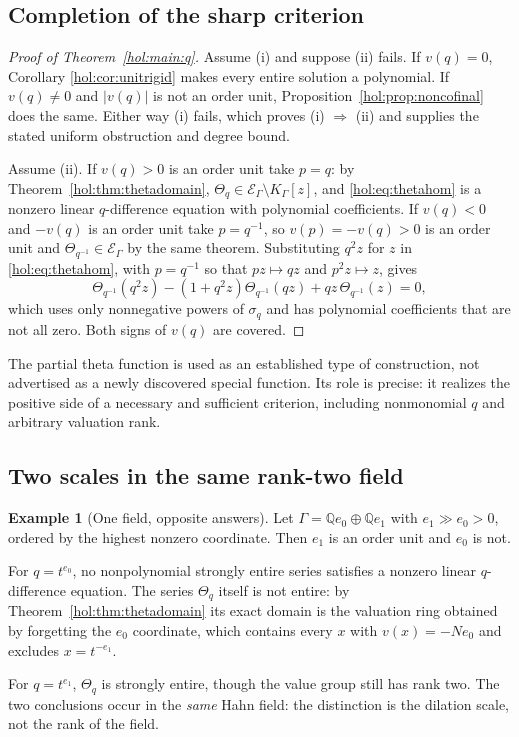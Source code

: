 \documentclass[11pt]{article}
\numberwithin{equation}{section}
\theoremstyle{definition}
\newtheorem{example}[theorem]{Example}
\theoremstyle{remark}
\newcommand{\Q}{\mathbb Q}
\newcommand{\K}{K_\Gamma}
\newcommand{\E}{\mathcal E_\Gamma}
\newcommand{\abs}[1]{\lvert#1\rvert}
\begin{document}
\subsection{Completion of the sharp criterion}

\begin{proof}[Proof of Theorem~\ref{hol:main:q}]
Assume (i) and suppose (ii) fails. If $v(q)=0$, Corollary
\ref{hol:cor:unitrigid} makes every entire solution a polynomial. If
$v(q)\ne0$ and $\abs{v(q)}$ is not an order unit,
Proposition~\ref{hol:prop:noncofinal} does the same. Either way (i) fails,
which proves (i) $\Rightarrow$ (ii) and supplies the stated uniform
obstruction and degree bound.

Assume (ii). If $v(q)>0$ is an order unit take $p=q$: by
Theorem~\ref{hol:thm:thetadomain}, $\Theta_q\in\E\setminus\K[z]$, and
\eqref{hol:eq:thetahom} is a nonzero linear $q$-difference equation with
polynomial coefficients. If $v(q)<0$ and $-v(q)$ is an order unit take
$p=q^{-1}$, so $v(p)=-v(q)>0$ is an order unit and $\Theta_{q^{-1}}\in\E$ by
the same theorem. Substituting $q^2z$ for $z$ in \eqref{hol:eq:thetahom},
with $p=q^{-1}$ so that $pz\mapsto qz$ and $p^2z\mapsto z$, gives
\begin{equation}\label{hol:eq:inverseq}
 \Theta_{q^{-1}}(q^2z)-(1+q^2z)\Theta_{q^{-1}}(qz)
 +qz\,\Theta_{q^{-1}}(z)=0,
\end{equation}
which uses only nonnegative powers of $\sigma_q$ and has polynomial
coefficients that are not all zero. Both signs of $v(q)$ are covered.
\end{proof}

The partial theta function is used as an established type of construction,
not advertised as a newly discovered special function. Its role is precise: it
realizes the positive side of a necessary and sufficient criterion, including
nonmonomial $q$ and arbitrary valuation rank.

\subsection{Two scales in the same rank-two field}

\begin{example}[One field, opposite answers]\label{hol:ex:ranktwo}
Let $\Gamma=\Q e_0\oplus\Q e_1$ with $e_1\gg e_0>0$, ordered by the highest
nonzero coordinate. Then $e_1$ is an order unit and $e_0$ is not.

For $q=t^{e_0}$, no nonpolynomial strongly entire series satisfies a nonzero
linear $q$-difference equation. The series $\Theta_q$ itself is not entire:
by Theorem~\ref{hol:thm:thetadomain} its exact domain is the valuation ring
obtained by forgetting the $e_0$ coordinate, which contains every $x$ with
$v(x)=-Ne_0$ and excludes $x=t^{-e_1}$.

For $q=t^{e_1}$, $\Theta_q$ is strongly entire, though the value group still
has rank two. The two conclusions occur in the \emph{same} Hahn field: the
distinction is the dilation scale, not the rank of the field.
\end{example}
\end{document}
